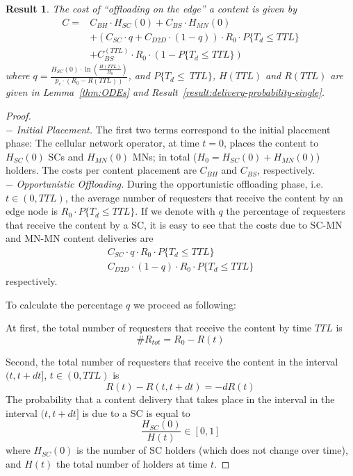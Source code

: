 \documentclass[10pt,conference,letterpaper]{IEEEtran}
\newtheorem{result}{Result}
\begin{document}
\begin{result}\label{thm:lemma-single-cost}
The cost of ``offloading on the edge'' a content is given by
\begin{align*}
C =& C_{BH}\cdot H_{SC}(0)+ C_{BS}\cdot H_{MN}(0)\\
	&+ \left(C_{SC}\cdot q+ C_{D2D}\cdot(1-q) \right)\cdot  R_{0}	\cdot P\{T_{d}\leq TTL\}\\
	&+ C_{BS}^{(TTL)}\cdot R_{0} \cdot \left(1-P\{T_{d}\leq TTL\}\right)
\end{align*}
where $q = \textstyle \frac{H_{SC}(0)\cdot \ln\left(\frac{H(TTL)}{H_{0}}\right)}{p_{c}\cdot\left(R_{0}-R(TTL)\right)}$, and $P\{T_{d}\leq~TTL\}$, $H(TTL)$ and $R(TTL)$ are given in Lemma~\ref{thm:ODEs} and Result~\ref{result:delivery-probability-single}.
\end{result}
\begin{proof}~\\
$-$ {\textit{Initial Placement.}} The first two terms correspond to the initial placement phase: The cellular network operator, at time $t=0$, places the content to $H_{SC}(0)$ SCs and $H_{MN}(0)$ MNs; in total ($H_{0} = H_{SC}(0)+H_{MN}(0)$) holders. The costs per content placement are $C_{BH}$ and $C_{BS}$, respectively.\\

\noindent$-$ {\textit{Opportunistic Offloading.}} During the opportunistic offloading phase, i.e. $t\in(0,TTL)$, the average number of requesters that receive the content by an edge node is $R_{0}\cdot P\{T_{d}\leq TTL\}$. If we denote with $q$ the percentage of requesters that receive the content by a SC, it is easy to see that the costs due to SC-MN and MN-MN content deliveries are
\begin{align} 
C_{SC}\cdot q\cdot  R_{0}\cdot P\{T_{d}\leq TTL\}\label{eq:cost-SC}\\
C_{D2D}\cdot(1-q)\cdot  R_{0}\cdot P\{T_{d}\leq TTL\}\label{eq:cost-D2D}
\end{align}
respectively. 

To calculate the percentage $q$ we proceed as following:

At first, the total number of requesters that receive the content by time $TTL$ is
\begin{equation}\label{eq:tot-requesters-ttl}
\#R_{tot} = R_{0}-R(t)
\end{equation}

Second, the total number of requesters that receive the content in the interval $(t,t+dt]$, $t\in(0,TTL)$ is
\begin{equation}
 R(t)-R(t,t+dt) = -dR(t)
\end{equation}
The probability that a content delivery that takes place in the interval in the interval $(t,t+dt]$ is due to a SC is equal to
\begin{equation}
 \frac{H_{SC}(0)}{H(t)}\in[0,1]
\end{equation}
where $H_{SC}(0)$ is the number of SC holders (which does not change over time), and $H(t)$ the total number of holders at time $t$.


\end{proof}
\end{document}
